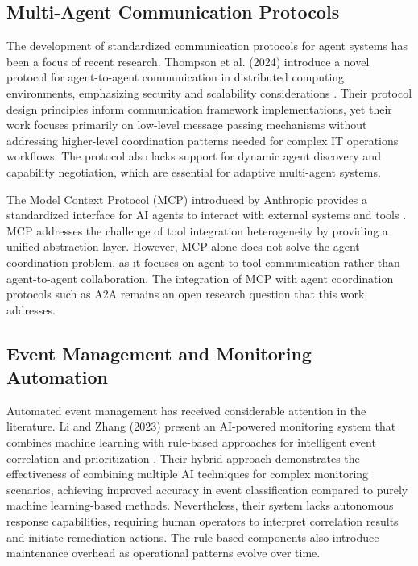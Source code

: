 \documentclass{article}
\begin{document}
\subsection{Multi-Agent Communication Protocols}

The development of standardized communication protocols for agent systems has been a focus of recent research. Thompson et al. (2024) introduce a novel protocol for agent-to-agent communication in distributed computing environments, emphasizing security and scalability considerations \cite{thompson2024}. Their protocol design principles inform communication framework implementations, yet their work focuses primarily on low-level message passing mechanisms without addressing higher-level coordination patterns needed for complex IT operations workflows. The protocol also lacks support for dynamic agent discovery and capability negotiation, which are essential for adaptive multi-agent systems.

The Model Context Protocol (MCP) introduced by Anthropic provides a standardized interface for AI agents to interact with external systems and tools \cite{anthropic2024}. MCP addresses the challenge of tool integration heterogeneity by providing a unified abstraction layer. However, MCP alone does not solve the agent coordination problem, as it focuses on agent-to-tool communication rather than agent-to-agent collaboration. The integration of MCP with agent coordination protocols such as A2A remains an open research question that this work addresses.

\subsection{Event Management and Monitoring Automation}

Automated event management has received considerable attention in the literature. Li and Zhang (2023) present an AI-powered monitoring system that combines machine learning with rule-based approaches for intelligent event correlation and prioritization \cite{li2023}. Their hybrid approach demonstrates the effectiveness of combining multiple AI techniques for complex monitoring scenarios, achieving improved accuracy in event classification compared to purely machine learning-based methods. Nevertheless, their system lacks autonomous response capabilities, requiring human operators to interpret correlation results and initiate remediation actions. The rule-based components also introduce maintenance overhead as operational patterns evolve over time.
\end{document}
